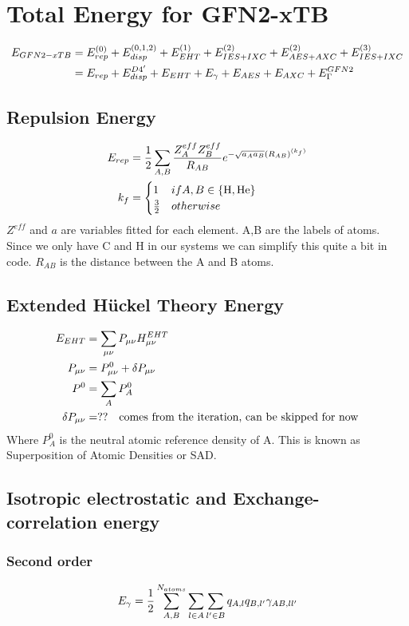 \section{Total Energy for GFN2-xTB}
\begin{equation}
\begin{split}
\E{GFN2-xTB} &= \E[0]{rep}+\E[0,1,2]{disp}+\E[1]{EHT}+\E[2]{IES+IXC}+\E[2]{AES+AXC}+\E[3]{IES+IXC}\\
&=\E{rep}+\E{disp}^{D4'}+\E{EHT}+\E{\gamma}+\E{AES}+\E{AXC}+\E{\Gamma}^{GFN2}
\end{split}
\end{equation}
\subsection{Repulsion Energy}
\begin{align}
\E{rep} &= \frac{1}{2}\sum_{A,B}\frac{Z^{eff}_A Z^{eff}_B}{R_{AB}}e^{-\sqrt{a_Aa_B}(R_{AB})^{(k_f)}}\\
k_f &= \begin{cases}1 & if A,B\in\{\text{H},\text{He}\}\\\frac{3}{2}&otherwise\end{cases} 
\end{align}
$Z^{eff}$ and $a$ are variables fitted for each element. A,B are the labels of atoms. 
Since we only have C and H in our systems we can simplify this quite a bit in code. 
$R_{AB}$ is the distance between the A and B atoms.
\subsection{Extended Hückel Theory Energy}
\begin{align}
    \E{EHT} &= \sum_{\mu\nu}P_{\mu\nu}H^{EHT}_{\mu\nu}\\
    P_{\mu\nu} &= P^0_{\mu\nu}+ \delta P_{\mu\nu}\\
    P^0&=\sum_AP_A^0\\ 
    \delta P_{\mu\nu} &=??\quad\text{comes from the iteration, can be skipped for now}
\end{align}
Where $P_A^0$ is the neutral atomic reference density of A. This is known as Superposition of Atomic Densities or SAD.  
\subsection{Isotropic electrostatic and Exchange-correlation energy}
\subsubsection{Second order}
\begin{equation}
    \E{\gamma} = \frac{1}{2}\sum_{A,B}^{N_{atoms}}\sum_{l\in A}\sum_{l'\in B}q_{A,l}q_{B,l'}\gamma_{AB,ll'}
\end{equation}
